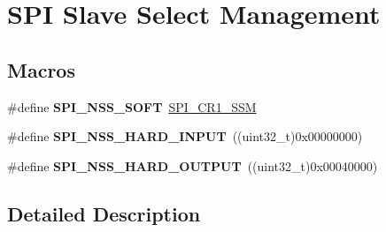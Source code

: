 \hypertarget{group___s_p_i___slave___select__management}{}\section{S\+PI Slave Select Management}
\label{group___s_p_i___slave___select__management}
\subsection*{Macros}
\begin{DoxyCompactItemize}
\item 
\#define {\bfseries S\+P\+I\+\_\+\+N\+S\+S\+\_\+\+S\+O\+FT}~\hyperlink{group___peripheral___registers___bits___definition_ga0e236047e05106cf1ba7929766311382}{S\+P\+I\+\_\+\+C\+R1\+\_\+\+S\+SM}\hypertarget{group___s_p_i___slave___select__management_ga0bf14691b9d03eb158f190cefa7ab8fc}{}\label{group___s_p_i___slave___select__management_ga0bf14691b9d03eb158f190cefa7ab8fc}

\item 
\#define {\bfseries S\+P\+I\+\_\+\+N\+S\+S\+\_\+\+H\+A\+R\+D\+\_\+\+I\+N\+P\+UT}~((uint32\+\_\+t)0x00000000)\hypertarget{group___s_p_i___slave___select__management_ga62c42a5e28ce3b0dc92c5186c10accf8}{}\label{group___s_p_i___slave___select__management_ga62c42a5e28ce3b0dc92c5186c10accf8}

\item 
\#define {\bfseries S\+P\+I\+\_\+\+N\+S\+S\+\_\+\+H\+A\+R\+D\+\_\+\+O\+U\+T\+P\+UT}~((uint32\+\_\+t)0x00040000)\hypertarget{group___s_p_i___slave___select__management_gab7f2da432661406a37fa2afe4efacd87}{}\label{group___s_p_i___slave___select__management_gab7f2da432661406a37fa2afe4efacd87}

\end{DoxyCompactItemize}


\subsection{Detailed Description}
